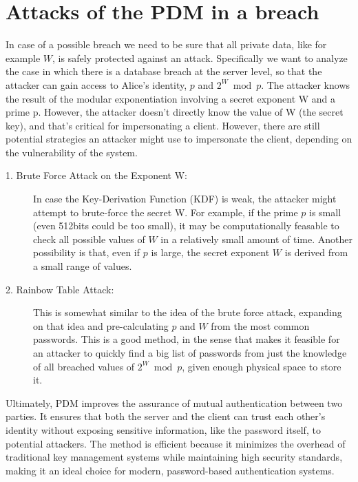 \documentclass{article}
\begin{document}
\section{Attacks of the PDM in a breach}
In case of a possible breach we need to be sure that all private data, like for example \(W\), is safely protected against an attack. Specifically we want to analyze the case in which there is a database breach at the server level, so that the attacker can gain access to Alice's identity, \(p\) and \(2^W \bmod p\). The attacker knows the result of the modular exponentiation involving a secret exponent W and a prime p. However, the attacker doesn't directly know the value of W (the secret key), and that’s critical for impersonating a client. However, there are still potential strategies an attacker might use to impersonate the client, depending on the vulnerability of the system.

\begin{description}
    \item[1. Brute Force Attack on the Exponent W:] In case the Key-Derivation Function (KDF) is weak, the attacker might attempt to brute-force the secret W. For example, if the prime \(p\) is small (even 512bits could be too small), it may be computationally feasable to check all possible values of \(W\) in a relatively small amount of time. Another possibility is that, even if \(p\) is large, the secret exponent \(W\) is derived from a small range of values.
    \item[2. Rainbow Table Attack:] This is somewhat similar to the idea of the brute force attack, expanding on that idea and pre-calculating \(p\) and \(W\) from the most common passwords. This is a good method, in the sense that makes it feasible for an attacker to quickly find a big list of passwords from just the knowledge of all breached values of \(2^W \bmod p\), given enough physical space to store it.
\end{description}
Ultimately, PDM improves the assurance of mutual authentication between two parties. It ensures that both the server and the client can trust each other's identity without exposing sensitive information, like the password itself, to potential attackers. The method is efficient because it minimizes the overhead of traditional key management systems while maintaining high security standards, making it an ideal choice for modern, password-based authentication systems.
\end{document}
